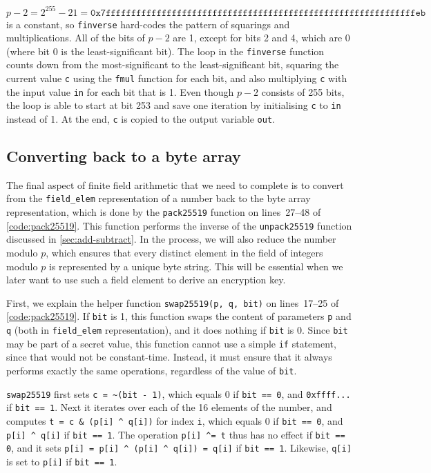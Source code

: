 \documentclass[manuscript]{acmart}
\begin{document}
$p-2 = 2^{255}-21 = \texttt{0x7fffffffffffffffffffffffffffffffffffffffffffffffffffffffffffffeb}$ is a constant, so \verb|finverse| hard-codes the pattern of squarings and multiplications.
All of the bits of $p-2$ are 1, except for bits 2 and 4, which are 0 (where bit 0 is the least-significant bit).
The loop in the \verb|finverse| function counts down from the most-significant to the least-significant bit, squaring the current value \verb|c| using the \verb|fmul| function for each bit, and also multiplying \verb|c| with the input value \verb|in| for each bit that is 1.
Even though $p-2$ consists of 255 bits, the loop is able to start at bit 253 and save one iteration by initialising \verb|c| to \verb|in| instead of 1.
At the end, \verb|c| is copied to the output variable \verb|out|.

\subsection{Converting back to a byte array}\label{sec:pack}

The final aspect of finite field arithmetic that we need to complete is to convert from the \verb|field_elem| representation of a number back to the byte array representation, which is done by the \verb|pack25519| function on lines~27--48 of \autoref{code:pack25519}.
This function performs the inverse of the \verb|unpack25519| function discussed in \autoref{sec:add-subtract}.
In the process, we will also reduce the number modulo $p$, which ensures that every distinct element in the field of integers modulo $p$ is represented by a unique byte string.
This will be essential when we later want to use such a field element to derive an encryption key.

First, we explain the helper function \verb|swap25519(p, q, bit)| on lines~17--25 of \autoref{code:pack25519}.
If \verb|bit| is 1, this function swaps the content of parameters \verb|p| and \verb|q| (both in \verb|field_elem| representation), and it does nothing if \verb|bit| is 0.
Since \verb|bit| may be part of a secret value, this function cannot use a simple \verb|if| statement, since that would not be constant-time.
Instead, it must ensure that it always performs exactly the same operations, regardless of the value of \verb|bit|.

\verb|swap25519| first sets \verb|c = ~(bit - 1)|, which equals 0 if \verb|bit == 0|, and \verb|0xffff...| if \verb|bit == 1|.
Next it iterates over each of the 16 elements of the number, and computes \verb|t = c & (p[i] ^ q[i])| for index \verb|i|, which equals 0 if \verb|bit == 0|, and \verb|p[i] ^ q[i]| if \verb|bit == 1|.
The operation \verb|p[i] ^= t| thus has no effect if \verb|bit == 0|, and it sets \verb|p[i] = p[i] ^ (p[i] ^ q[i]) = q[i]| if \verb|bit == 1|.
Likewise, \verb|q[i]| is set to \verb|p[i]| if \verb|bit == 1|.
\end{document}
